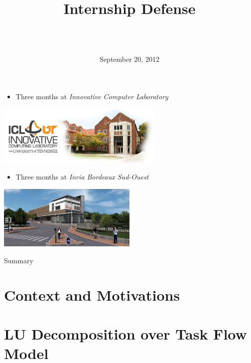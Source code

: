 \documentclass{beamer}
\title[Enabling Partial Pivoting in Task Flow LU Factorization]{
        {\bfseries \projet\\} 
        {\bfseries \huge \sujet}
        {\small Internship Defense}
}
\date{September 20, 2012}
\author[Zenati]{
  {\normalsize \bfseries \sffamily} {\large \gA}\\
  \vspace{1cm}
  {\normalsize \bfseries \sffamily} {\large \gB}\\
}
\begin{document}
\begin{frame}
\maketitle
\end{frame}

\begin{frame}
\begin{itemize}
\item Three months at \textit{Innovative Computer Laboratory}
\end{itemize}
\begin{center}
\includegraphics[width=0.6\textwidth]{icl-claxton.jpg}
\end{center}
\begin{itemize}
\item Three months at \textit{Inria Bordeaux Sud-Ouest}
\end{itemize}
\begin{center}
\includegraphics[width=0.5\textwidth]{bandeau-home-bordeaux.jpg}
\end{center}
\end{frame}

\begin{frame}{Summary}
\tableofcontents
\end{frame}

\section[Context]{Context and Motivations}


\section[Task Flow LU]{LU Decomposition over Task Flow Model}

\end{document}
